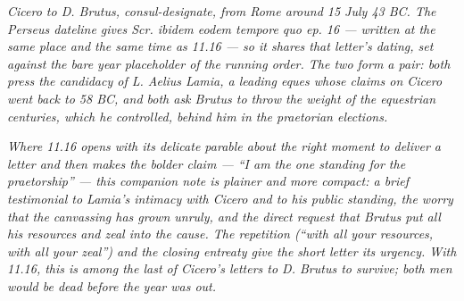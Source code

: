 
\textit{Cicero to D. Brutus, consul-designate, from Rome around
15 July 43 BC. The Perseus dateline gives \textit{Scr. ibidem
eodem tempore quo ep. 16} --- written at the same place and the
same time as 11.16 --- so it shares that letter's dating, set
against the bare year placeholder of the running order. The two
form a pair: both press the candidacy of L. Aelius Lamia, a
leading \textit{eques} whose claims on Cicero went back to 58
BC, and both ask Brutus to throw the weight of the equestrian
centuries, which he controlled, behind him in the praetorian
elections.}

\textit{Where 11.16 opens with its delicate parable about the
right moment to deliver a letter and then makes the bolder
claim --- ``I am the one standing for the praetorship'' ---
this companion note is plainer and more compact: a brief
testimonial to Lamia's intimacy with Cicero and to his public
standing, the worry that the canvassing has grown unruly, and
the direct request that Brutus put all his resources and zeal
into the cause. The repetition (``with all your resources, with
all your zeal'') and the closing entreaty give the short letter
its urgency. With 11.16, this is among the last of Cicero's
letters to D. Brutus to survive; both men would be dead before
the year was out.}
